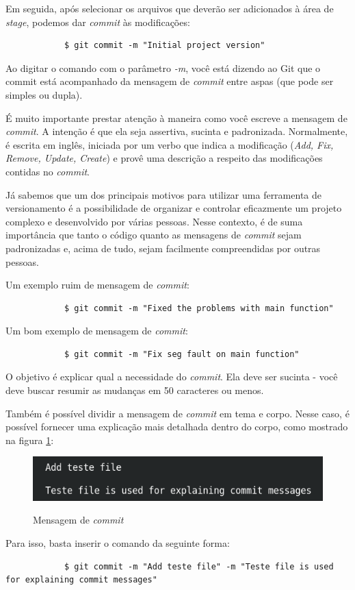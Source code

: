         Em seguida, após selecionar os arquivos que deverão ser adicionados à área de \textit{stage}, podemos dar \textit{commit} às modificações:
        \begin{lstlisting}
            $ git commit -m "Initial project version"
        \end{lstlisting}

        Ao digitar o comando com o parâmetro \textit{-m}, você está dizendo ao Git que o commit está acompanhado da mensagem de \textit{commit} entre aspas (que pode ser simples ou dupla).
        \par É muito importante prestar atenção à maneira como você escreve a mensagem de \textit{commit}. A intenção é que ela seja assertiva, sucinta e padronizada. Normalmente, é escrita em inglês, iniciada por um verbo que indica a modificação (\textit{Add, Fix, Remove, Update, Create}) e provê uma descrição a respeito das modificações contidas no \textit{commit}.
        \par Já sabemos que um dos principais motivos para utilizar uma ferramenta de versionamento é a possibilidade de organizar e controlar eficazmente um projeto complexo e desenvolvido por várias pessoas. Nesse contexto, é de suma importância que tanto o código quanto as mensagens de \textit{commit} sejam padronizadas e, acima de tudo, sejam facilmente compreendidas por outras pessoas.
        \par Um exemplo ruim de mensagem de \textit{commit}:
        \begin{lstlisting}
            $ git commit -m "Fixed the problems with main function"
        \end{lstlisting}
        Um bom exemplo de mensagem de \textit{commit}:
        \begin{lstlisting}
            $ git commit -m "Fix seg fault on main function"
        \end{lstlisting}
        \par O objetivo é explicar qual a necessidade do \textit{commit}. Ela deve ser sucinta - você deve buscar resumir as mudanças em 50 caracteres ou menos.
        \par Também é possível dividir a mensagem de \textit{commit} em tema e corpo. Nesse caso, é possível fornecer uma explicação mais detalhada dentro do corpo, como mostrado na figura \ref{figura:mensagem_commit}:
        \begin{figure}[H]
            \caption{Mensagem de \textit{commit}}
            \vspace{0.5cm}
            \centering
            \includegraphics[width=12cm]{images/mensagem_commit.png}
            \label{figura:mensagem_commit}
        \end{figure}
        Para isso, basta inserir o comando da seguinte forma:
        \begin{lstlisting}
            $ git commit -m "Add teste file" -m "Teste file is used for explaining commit messages"
        \end{lstlisting}

